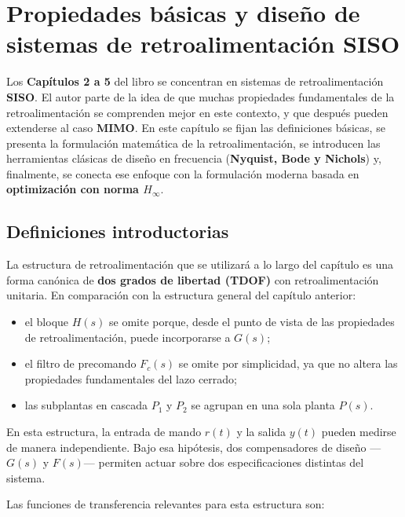 
\chapter{Propiedades básicas y diseño de sistemas de retroalimentación SISO}

Los \textbf{Capítulos 2 a 5} del libro se concentran en sistemas de retroalimentación \textbf{SISO}. El autor parte de la idea de que muchas propiedades fundamentales de la retroalimentación se comprenden mejor en este contexto, y que después pueden extenderse al caso \textbf{MIMO}. En este capítulo se fijan las definiciones básicas, se presenta la formulación matemática de la retroalimentación, se introducen las herramientas clásicas de diseño en frecuencia (\textbf{Nyquist, Bode y Nichols}) y, finalmente, se conecta ese enfoque con la formulación moderna basada en \textbf{optimización con norma \(H_\infty\)}.


\section{Definiciones introductorias}
La estructura de retroalimentación que se utilizará a lo largo del capítulo es una forma canónica de \textbf{dos grados de libertad (TDOF)} con retroalimentación unitaria. En comparación con la estructura general del capítulo anterior:

\begin{itemize}
  \item el bloque \(H(s)\) se omite porque, desde el punto de vista de las propiedades de retroalimentación, puede incorporarse a \(G(s)\);
  \item el filtro de precomando \(F_c(s)\) se omite por simplicidad, ya que no altera las propiedades fundamentales del lazo cerrado;
  \item las subplantas en cascada \(P_1\) y \(P_2\) se agrupan en una sola planta \(P(s)\).
\end{itemize}

En esta estructura, la entrada de mando \(r(t)\) y la salida \(y(t)\) pueden medirse de manera independiente. Bajo esa hipótesis, dos compensadores de diseño —\(G(s)\) y \(F(s)\)— permiten actuar sobre dos especificaciones distintas del sistema.


Las funciones de transferencia relevantes para esta estructura son:

